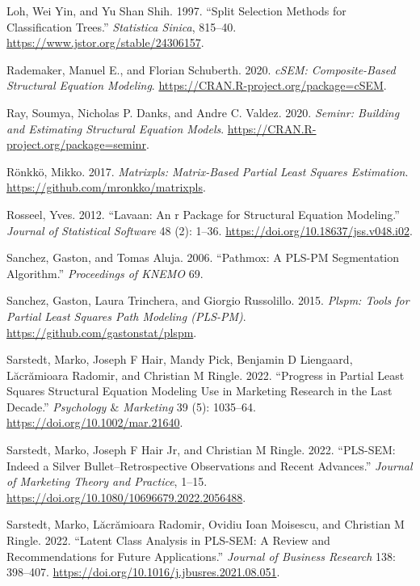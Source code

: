 \begin{CSLReferences}{1}{0}
\leavevmode{}%
Loh, Wei Yin, and Yu Shan Shih. 1997. {``Split Selection Methods for Classification Trees.''} \emph{Statistica Sinica}, 815--40. \url{https://www.jstor.org/stable/24306157}.

\leavevmode{}%
Rademaker, Manuel E., and Florian Schuberth. 2020. \emph{cSEM: Composite-Based Structural Equation Modeling}. \url{https://CRAN.R-project.org/package=cSEM}.

\leavevmode{}%
Ray, Soumya, Nicholas P. Danks, and Andre C. Valdez. 2020. \emph{Seminr: Building and Estimating Structural Equation Models}. \url{https://CRAN.R-project.org/package=seminr}.

\leavevmode{}%
Rönkkö, Mikko. 2017. \emph{Matrixpls: Matrix-Based Partial Least Squares Estimation}. \url{https://github.com/mronkko/matrixpls}.

\leavevmode{}%
Rosseel, Yves. 2012. {``Lavaan: An r Package for Structural Equation Modeling.''} \emph{Journal of Statistical Software} 48 (2): 1--36. \url{https://doi.org/10.18637/jss.v048.i02}.

\leavevmode{}%
Sanchez, Gaston, and Tomas Aluja. 2006. {``Pathmox: A PLS-PM Segmentation Algorithm.''} \emph{Proceedings of KNEMO} 69.

\leavevmode{}%
Sanchez, Gaston, Laura Trinchera, and Giorgio Russolillo. 2015. \emph{Plspm: Tools for Partial Least Squares Path Modeling (PLS-PM)}. \url{https://github.com/gastonstat/plspm}.

\leavevmode{}%
Sarstedt, Marko, Joseph F Hair, Mandy Pick, Benjamin D Liengaard, Lăcrămioara Radomir, and Christian M Ringle. 2022. {``Progress in Partial Least Squares Structural Equation Modeling Use in Marketing Research in the Last Decade.''} \emph{Psychology \(\&\) Marketing} 39 (5): 1035--64.\href{\%20https://doi.org/10.1002/mar.21640}{ https://doi.org/10.1002/mar.21640}.

\leavevmode{}%
Sarstedt, Marko, Joseph F Hair Jr, and Christian M Ringle. 2022. {``PLS-SEM: Indeed a Silver Bullet--Retrospective Observations and Recent Advances.''} \emph{Journal of Marketing Theory and Practice}, 1--15. \url{https://doi.org/10.1080/10696679.2022.2056488}.

\leavevmode{}%
Sarstedt, Marko, Lăcrămioara Radomir, Ovidiu Ioan Moisescu, and Christian M Ringle. 2022. {``Latent Class Analysis in PLS-SEM: A Review and Recommendations for Future Applications.''} \emph{Journal of Business Research} 138: 398--407. \url{https://doi.org/10.1016/j.jbusres.2021.08.051}.


\end{CSLReferences}
